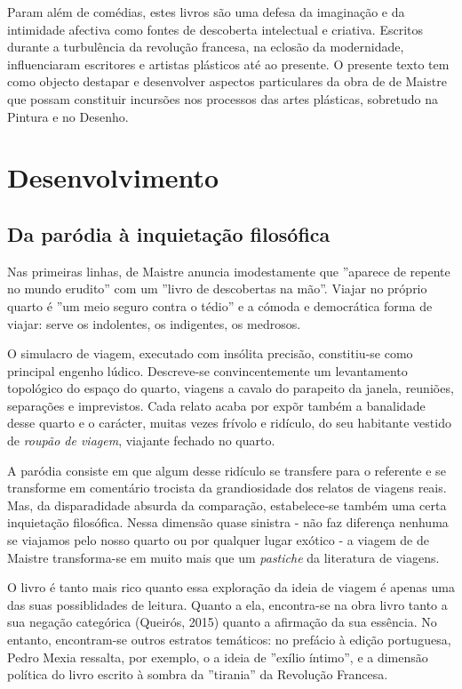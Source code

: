 \documentclass[12pt]{article}
\begin{document}
Param além de comédias, estes livros são uma defesa da imaginação e da
intimidade afectiva como fontes de descoberta intelectual e
criativa. Escritos durante a turbulência da revolução francesa, na
eclosão da modernidade, influenciaram escritores e artistas plásticos
até ao presente. O presente texto tem como objecto destapar e
desenvolver aspectos particulares da obra de de Maistre que possam
constituir incursões nos processos das artes plásticas, sobretudo na
Pintura e no Desenho.

\section{Desenvolvimento}

\subsection{Da paródia à inquietação filosófica}

Nas primeiras linhas, de Maistre anuncia imodestamente que ''aparece
de repente no mundo erudito'' com um ''livro de descobertas na
mão''. Viajar no próprio quarto é ''um meio seguro contra o tédio'' e
a cómoda e democrática forma de viajar: serve os indolentes, os
indigentes, os medrosos.

O simulacro de viagem, executado com insólita precisão, constitiu-se
como principal engenho lúdico. Descreve-se convincentemente um
levantamento topológico do espaço do quarto, viagens a cavalo do
parapeito da janela, reuniões, separações e imprevistos. Cada relato
acaba por expõr também a banalidade desse quarto e o carácter, muitas
vezes frívolo e ridículo, do seu habitante vestido de \emph{roupão de
  viagem}, viajante fechado no quarto.

A paródia consiste em que algum desse ridículo se transfere para o
referente e se transforme em comentário trocista da grandiosidade dos
relatos de viagens reais. Mas, da disparadidade absurda da comparação,
estabelece-se também uma certa inquietação filosófica. Nessa dimensão
quase sinistra - não faz diferença nenhuma se viajamos pelo nosso
quarto ou por qualquer lugar exótico - a viagem de de Maistre
transforma-se em muito mais que um \emph{pastiche} da literatura de
viagens.

O livro é tanto mais rico quanto essa exploração da ideia de viagem é
apenas uma das suas possiblidades de leitura. Quanto a ela,
encontra-se na obra livro tanto a sua negação categórica (Queirós,
2015) quanto a afirmação da sua essência. No entanto, encontram-se
outros estratos temáticos: no prefácio à edição portuguesa, Pedro
Mexia ressalta, por exemplo, o a ideia de ''exílio íntimo'', e a
dimensão política do livro escrito à sombra da ''tirania'' da
Revolução Francesa.
\end{document}
